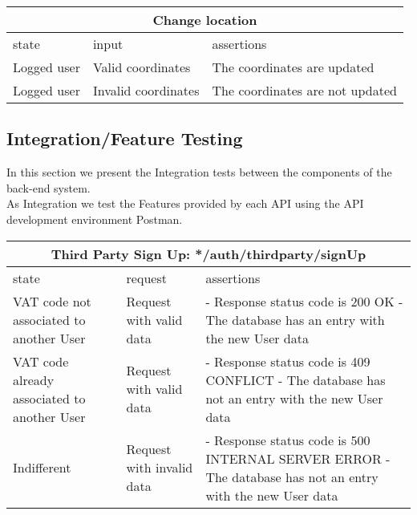 \begin{center}
	\begin{tabular}{|p{}|p{}|p{}|}
		\hline
		\multicolumn{3}{c}{Change location}\\
		\hline
		state & input & assertions \\
		\hline
		Logged user &
		Valid coordinates& 
		The coordinates are updated \newline
		\\
		\hline
		Logged user &
		Invalid coordinates& 
		The coordinates are not updated \newline
		\\
		\hline
	\end{tabular}
\end{center}

\subsection{Integration/Feature Testing}
In this section we present the Integration tests between the components of the back-end system.\\
As Integration we test the Features provided by each API using the API development environment Postman.\\

\begin{center}
	\begin{tabular}{|p{}|p{}|p{}|}
		\hline
		\multicolumn{3}{c}{Third Party Sign Up: */auth/thirdparty/signUp}\\

		\hline
		state & request & assertions \\
		
		\hline
		VAT code not associated to another User &
		Request with valid data & 
		- Response status code is 200 OK \newline
		- The database has an entry with the new User data
		\\
		
		\hline
		VAT code already associated to another User   &
		Request with valid data & 
		- Response status code is 409 CONFLICT\newline
		- The database has not an entry with the new User data
		\\
		
		\hline
		Indifferent  &
		Request with invalid data & 
		- Response status code is 500 INTERNAL SERVER ERROR\newline
		- The database has not an entry with the new User data
		\\
		
		\hline

	\end{tabular}
\end{center}

